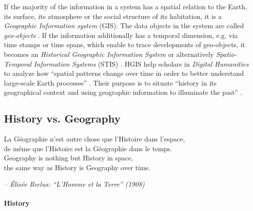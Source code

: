 If the majority of the information in a system has a spatial relation to the Earth, its surface, its atmosphere or the social structure of its habitation, it is a \emph{Geographic Information system} (GIS). The data objects in the system are called \emph{geo-objects}
\cite{bolstad2008gis}.
If the information additionally has a temporal dimension, e.g. via time stamps or time spans, which enable to trace developments of geo-objects, it becomes an \emph{Historical Geographic Information System}
\cite{gregory2014toward}
or alternatively \emph{Spatio-Temporal Information Systems} (STIS)
\cite{pelekis04stdms}.
HGIS help scholars in \emph{Digital Humanities} to analyze how ``spatial patterns change over time in order to better understand large-scale Earth processes''
\cite{peuquet99}.
Their purpose is to situate ``history in its geographical context and using geographic information to illuminate the past''
\cite[p. 3]{knowles2008placing}.

\subsection{History vs. Geography} %
\label{sub:history_vs_geography}

\begin{quoteit}
La Géographie n’est autre chose que l’Histoire dans l’espace, \\
de même que l’Histoire est la Géographie dans le temps. \\[1.0em]
Geography is nothing but History in space, \\
the same way as History is Geography over time.
\end{quoteit}
\hfill \textit{-- Élisée Reclus: ``L'Homme et la Terre'' (1908)}

\paragraph{History} %
\label{par:history}


